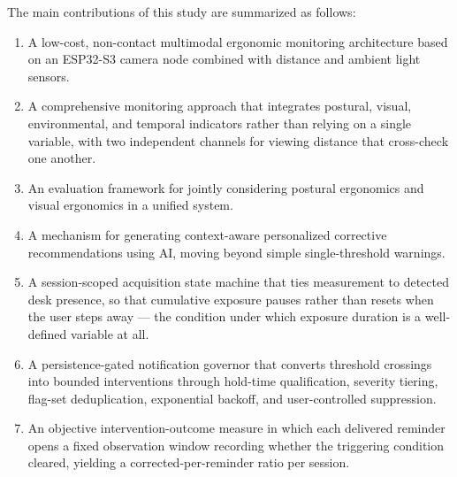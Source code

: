 The main contributions of this study are summarized as follows:
\begin{enumerate}
    \item A low-cost, non-contact multimodal ergonomic monitoring architecture based on an ESP32-S3 camera node combined with distance and ambient light sensors.
    \item A comprehensive monitoring approach that integrates postural, visual, environmental, and temporal indicators rather than relying on a single variable, with two independent channels for viewing distance that cross-check one another.
    \item An evaluation framework for jointly considering postural ergonomics and visual ergonomics in a unified system.
    \item A mechanism for generating context-aware personalized corrective recommendations using AI, moving beyond simple single-threshold warnings.
    \item A session-scoped acquisition state machine that ties measurement to detected desk presence, so that cumulative exposure pauses rather than resets when the user steps away --- the condition under which exposure duration is a well-defined variable at all.
    \item A persistence-gated notification governor that converts threshold crossings into bounded interventions through hold-time qualification, severity tiering, flag-set deduplication, exponential backoff, and user-controlled suppression.
    \item An objective intervention-outcome measure in which each delivered reminder opens a fixed observation window recording whether the triggering condition cleared, yielding a corrected-per-reminder ratio per session.
\end{enumerate}

